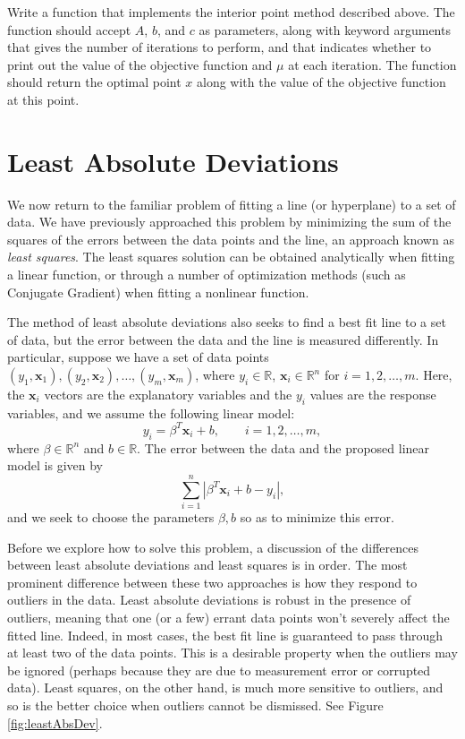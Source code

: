 \begin{problem}
Write a function  that implements the interior point method described above.
The function should accept $A$, $b$, and $c$ as parameters, along with keyword arguments
 that gives the number of iterations to perform, and  that indicates
whether to print out the value of the objective function and $\mu$ at each iteration.
The function should return the optimal point $x$ along with the value of the objective function at this
point.
\end{problem}
\section*{Least Absolute Deviations}
We now return to the familiar problem of fitting a line (or hyperplane) to a set of data. We have previously approached this
problem by minimizing the sum of the squares of the errors between the data points and the line, an approach known as \emph{least
squares}. The least squares solution can be obtained analytically when fitting a linear function, or through a number of optimization
methods (such as Conjugate Gradient) when fitting a nonlinear function.

The method of least absolute deviations also seeks to find a best fit line to a set of data, but the error between the data and
the line is measured differently. In particular, suppose we have a set of data points $(y_1, \mathbf{x}_1), (y_2, \mathbf{x}_2), \ldots,
(y_m, \mathbf{x}_m)$, where $y_i \in \mathbb{R}$, $\mathbf{x}_i \in \mathbb{R}^n$ for $i = 1, 2, \ldots, m$. Here, the $\mathbf{x}_i$ vectors
are the explanatory variables and the $y_i$ values are the response variables, and we assume the following linear model:
\[
y_i = \beta^T\mathbf{x}_i + b, \qquad i = 1, 2, \ldots, m,
\]
where $\beta\in\mathbb{R}^n$ and $b \in \mathbb{R}$. The error between the data and the proposed linear model is given by
\[
\sum_{i=1}^n |\beta^T\mathbf{x}_i + b - y_i|,
\]
and we seek to choose the parameters $\beta, b$ so as to minimize this error.

Before we explore how to solve this problem, a discussion of the differences between least absolute deviations and least squares is in order.
The most prominent difference between these two approaches is how they respond to outliers in the data. Least absolute deviations is
robust in the presence of outliers, meaning that one (or a few) errant data points won't severely affect the fitted line. Indeed, in most cases,
the best fit line is guaranteed to pass through at least two of the data points.
This is a desirable property when the outliers may be ignored (perhaps because they are due to measurement error or corrupted data).
Least squares, on the other hand,
is much more sensitive to outliers, and so is the better choice when outliers cannot be dismissed. See Figure \ref{fig:leastAbsDev}.

